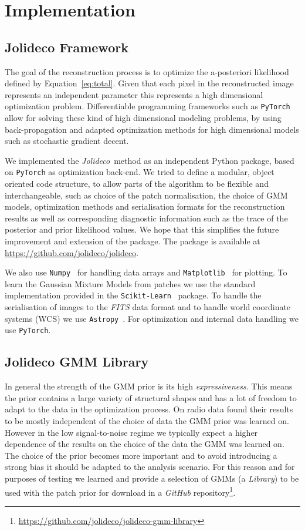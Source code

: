 \documentclass[twocolumn]{aastex631}
\newcommand{\jolideco}{\textit{Jolideco}~}
\begin{document}
    \section{Implementation}
    \subsection{Jolideco Framework}
    The goal of the reconstruction process is to optimize the a-posteriori likelihood defined by Equation~\ref{eq:total}. Given that each pixel in the reconstructed image represents an independent parameter this represents a high dimensional optimization problem. Differentiable programming frameworks such as \texttt{PyTorch}~\citep{Pytorch2019} allow for solving these kind of high dimensional modeling problems, by using back-propagation and adapted optimization methods for high dimensional models such as stochastic gradient decent.

    We implemented the \jolideco method as an independent Python package, based on \texttt{PyTorch} as optimization back-end. We tried to define a modular, object oriented code structure, to allow parts of the algorithm to be flexible and interchangeable, such as choice of the patch normalisation, the choice of GMM models, optimization methods and serialisation formats for the reconstruction results as well as corresponding diagnostic information such as the trace of the posterior and prior likelihood values. We hope that this simplifies the future improvement and extension of the package. The package is available at \url{https://github.com/jolideco/jolideco}.

    We also use \texttt{Numpy}~\citep{Numpy2020} for handling data arrays and \texttt{Matplotlib}~\citep{Hunter2007} for plotting. To learn the Gaussian Mixture Models from patches we use the standard implementation provided in the \texttt{Scikit-Learn}~\citep{Skimage2014} package. To handle the serialisation of images to the \textit{FITS} data format and to handle world coordinate systems (WCS) we use \texttt{Astropy}~\citep{Astropy2018}. For optimization and internal data handling we use \texttt{PyTorch}.

    \subsection{Jolideco GMM Library}
    \label{ssec:jolideco-gmm-library}
    In general the strength of the GMM prior is its high \textit{expressiveness}. This means the prior contains a large variety of structural shapes and has a lot of freedom to adapt to the data in the optimization process. On radio data \cite{Bouman2016} found their results to be mostly independent of the choice of data the GMM prior was learned on. However in the low signal-to-noise regime we typically expect a higher dependence of the results on the choice of the data the GMM was learned on. The choice of the prior becomes more important and to avoid introducing a strong bias it should be adapted to the analysis scenario. For this reason and for purposes of testing we learned and provide a selection of GMMs (a \textit{Library}) to be used with the patch prior for download in a \textit{GitHub} repository\footnote{\url{https://github.com/jolideco/jolideco-gmm-library}}.
    
\end{document}
